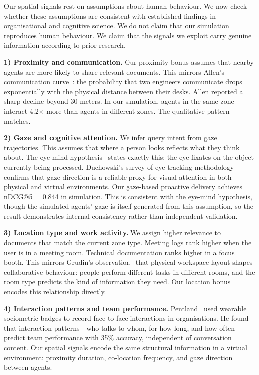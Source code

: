 \documentclass[journal]{IEEEtran}
\begin{document}
Our spatial signals rest on assumptions about human behaviour. We now
check whether these assumptions are consistent with established
findings in organisational and cognitive science. We do not claim
that our simulation reproduces human behaviour. We claim that the
signals we exploit carry genuine information according to prior
research.

\textbf{1) Proximity and communication.}
Our proximity bonus assumes that nearby agents are more likely to
share relevant documents. This mirrors Allen's communication
curve~\cite{Allen1977}: the probability that two
engineers communicate drops exponentially with the physical distance
between their desks. Allen reported a sharp decline beyond 30 meters.
In our simulation, agents in the same zone interact 4.2$\times$ more
than agents in different zones. The qualitative pattern matches.

\textbf{2) Gaze and cognitive attention.}
We infer query intent from gaze trajectories. This assumes that
where a person looks reflects what they think about. The eye-mind
hypothesis~\cite{JustCarpenter1980} states exactly this:
the eye fixates on the object currently being processed. Duchowski's
survey of eye-tracking methodology~\cite{Duchowski2017}
confirms that gaze direction is a reliable proxy for visual attention
in both physical and virtual environments. Our gaze-based proactive
delivery achieves nDCG@5 = 0.844 in simulation.  This is consistent
with the eye-mind hypothesis, though the simulated agents' gaze is
itself generated from this assumption, so the result demonstrates
internal consistency rather than independent validation.

\textbf{3) Location type and work activity.}
We assign higher relevance to documents that match the current zone
type. Meeting logs rank higher when the user is in a meeting room.
Technical documentation ranks higher in a focus booth. This mirrors
Grudin's observation~\cite{grudin1994groupware} that physical
workspace layout shapes collaborative behaviour: people perform
different tasks in different rooms, and the room type predicts
the kind of information they need. Our location bonus encodes
this relationship directly.

\textbf{4) Interaction patterns and team performance.}
Pentland~\cite{pentland_badges} used wearable sociometric
badges to record face-to-face interactions in organisations. He found
that interaction patterns---who talks to whom, for how long, and
how often---predict team performance with 35\% accuracy, independent
of conversation content. Our spatial signals encode the same
structural information in a virtual environment: proximity duration,
co-location frequency, and gaze direction between agents.
\end{document}

